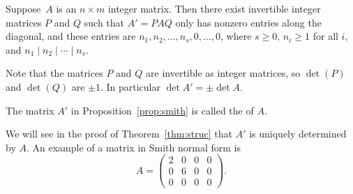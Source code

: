 \begin{proposition}
  \label{prop:smith}
  Suppose~$A$ is an $n\times m$ integer matrix.  Then there exist
  invertible integer matrices $P$ and $Q$ such that $A'=PAQ$ only
  has nonzero entries along the diagonal, and these entries are
  $n_1, n_2,\dots, n_s,0,\dots,0$, where
  $s\geq 0$, $n_i\geq 1$ for all $i$, and $n_1\mid n_2 \mid \cdots \mid n_s$.
\end{proposition}


\begin{remark}
  Note that the matrices $P$ and $Q$ are invertible as integer
  matrices, so $\det(P)$ and $\det(Q)$ are $\pm 1$. In particular
  $\det A' = \pm\det A$.
\end{remark}

\begin{definition}
  The matrix $A'$ in Proposition~\ref{prop:smith}
  is called the  of $A$.
\end{definition}

We will see in the proof of Theorem~\ref{thm:struc} that
$A'$ is uniquely determined by $A$.
An example of a matrix in Smith normal form is
$$
  A=\begin{pmatrix}
    2 & 0 & 0 & 0 \\
    0 & 6 & 0 & 0 \\
    0 & 0 & 0 & 0
  \end{pmatrix}.
$$

